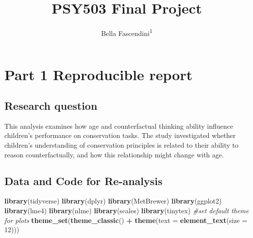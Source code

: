 \documentclass[
  doc]{apa6}
\title{PSY503 Final Project}
\author{Bella Fascendini\textsuperscript{1}}
\date{}
\affiliation{\phantom{0}}
\newenvironment{Shaded}{\begin{snugshade}}{\end{snugshade}}
\newcommand{\AttributeTok}[1]{\textcolor[rgb]{0.13,0.29,0.53}{#1}}
\newcommand{\CommentTok}[1]{\textcolor[rgb]{0.56,0.35,0.01}{\textit{#1}}}
\newcommand{\DecValTok}[1]{\textcolor[rgb]{0.00,0.00,0.81}{#1}}
\newcommand{\FunctionTok}[1]{\textcolor[rgb]{0.13,0.29,0.53}{\textbf{#1}}}
\newcommand{\NormalTok}[1]{#1}
\newcommand{\SpecialCharTok}[1]{\textcolor[rgb]{0.81,0.36,0.00}{\textbf{#1}}}
\begin{document}
\maketitle

\begin{Shaded}
\end{Shaded}

\section{Part 1 Reproducible report}\label{part-1-reproducible-report}

\subsection{Research question}\label{research-question}

This analysis examines how age and counterfactual thinking ability influence children's performance on conservation tasks. The study investigated whether children's understanding of conservation principles is related to their ability to reason counterfactually, and how this relationship might change with age.

\subsection{Data and Code for Re-analysis}\label{data-and-code-for-re-analysis}

\begin{Shaded}
\begin{Highlighting}[]
\FunctionTok{library}\NormalTok{(tidyverse)}
\FunctionTok{library}\NormalTok{(dplyr)}
\FunctionTok{library}\NormalTok{(MetBrewer)}
\FunctionTok{library}\NormalTok{(ggplot2)}
\FunctionTok{library}\NormalTok{(lme4)}
\FunctionTok{library}\NormalTok{(nlme)}
\FunctionTok{library}\NormalTok{(scales)}
\FunctionTok{library}\NormalTok{(tinytex)}
\CommentTok{\#set default theme for plots}
\FunctionTok{theme\_set}\NormalTok{(}\FunctionTok{theme\_classic}\NormalTok{() }\SpecialCharTok{+} 
            \FunctionTok{theme}\NormalTok{(}\AttributeTok{text =} \FunctionTok{element\_text}\NormalTok{(}\AttributeTok{size =} \DecValTok{12}\NormalTok{))) }
\end{Highlighting}
\end{Shaded}
\end{document}
